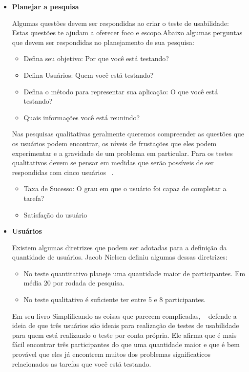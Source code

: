 \begin{itemize}
\item \textbf{Planejar a pesquisa}

Algumas questões devem ser respondidas ao criar o teste de usabilidade: Estas questões te ajudam a oferecer foco e escopo.Abaixo algumas perguntas que devem ser respondidas no planejamento de sua pesquisa:

\begin{itemize}
\item Defina seu objetivo: Por que você está testando? %
\item Defina Usuários: Quem você está testando? %
\item Defina o método para representar sua aplicação: O que você está testando?
\item Quais informações você está reunindo? 
\end{itemize}

Nas pesquisas qualitativas geralmente queremos compreender as questões que os usuários podem encontrar, os níveis de frustações que eles podem experimentar e a gravidade de um problema em particular. Para os testes qualitativos devem se pensar em medidas que serão possíveis de ser respondidas com cinco usuários ~\cite{unger2009}. 

	\begin{itemize}
		\item Taxa de Sucesso: O grau em que o usuário foi capaz de completar a tarefa?
		\item Satisfação do usuário
	\end{itemize}

\item \textbf{Usuários}

Existem algumas diretrizes que podem ser adotadas para a definição da quantidade de usuários. Jacob Nielsen definiu algumas dessas diretrizes:

\begin{itemize}
\item No teste quantitativo planeje uma quantidade maior de participantes. Em média 20 por rodada de pesquisa.
\item No teste qualitativo é suficiente ter entre 5 e 8 participantes.
\end{itemize}

	Em seu livro Simplificando as coisas que parecem complicadas, ~ defende a ideia de que três usuários são ideais para realização de testes de usabilidade para quem está realizando o teste por conta própria. Ele afirma que é mais fácil encontrar três participantes do que uma quantidade maior e que é bem provável que eles já encontrem muitos dos problemas significaticos relacionados as tarefas que você está testando.


\end{itemize}
